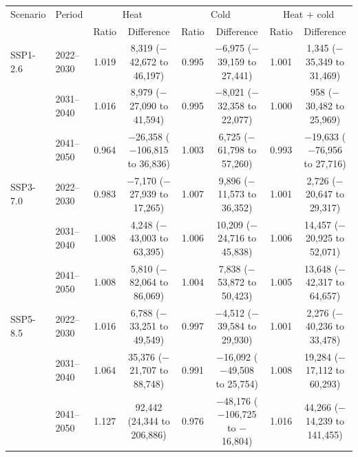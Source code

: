 \begin{tabular}{llcccccc}
\toprule
Scenario & Period & \multicolumn{2}{c}{Heat} & \multicolumn{2}{c}{Cold} & \multicolumn{2}{c}{Heat + cold} \\ & & Ratio & Difference & Ratio & Difference & Ratio & Difference \\
\midrule
SSP1-2.6 & 2022--2030 & 1.019 & 8,319 ($-$42,672 to 46,197) & 0.995 & $-$6,975 ($-$39,159 to 27,441) & 1.001 & 1,345 ($-$35,349 to 31,469) \\
 & 2031--2040 & 1.016 & 8,979 ($-$27,090 to 41,594) & 0.995 & $-$8,021 ($-$32,358 to 22,077) & 1.000 & 958 ($-$30,482 to 25,969) \\
 & 2041--2050 & 0.964 & $-$26,358 ($-$106,815 to 36,836) & 1.003 & 6,725 ($-$61,798 to 57,260) & 0.993 & $-$19,633 ($-$76,956 to 27,716) \\
\addlinespace
SSP3-7.0 & 2022--2030 & 0.983 & $-$7,170 ($-$27,939 to 17,265) & 1.007 & 9,896 ($-$11,573 to 36,352) & 1.001 & 2,726 ($-$20,647 to 29,317) \\
 & 2031--2040 & 1.008 & 4,248 ($-$43,003 to 63,395) & 1.006 & 10,209 ($-$24,716 to 45,838) & 1.006 & 14,457 ($-$20,925 to 52,071) \\
 & 2041--2050 & 1.008 & 5,810 ($-$82,064 to 86,069) & 1.004 & 7,838 ($-$53,872 to 50,423) & 1.005 & 13,648 ($-$42,317 to 64,657) \\
\addlinespace
SSP5-8.5 & 2022--2030 & 1.016 & 6,788 ($-$33,251 to 49,549) & 0.997 & $-$4,512 ($-$39,584 to 29,930) & 1.001 & 2,276 ($-$40,236 to 33,478) \\
 & 2031--2040 & 1.064 & 35,376 ($-$21,707 to 88,748) & 0.991 & $-$16,092 ($-$49,508 to 25,754) & 1.008 & 19,284 ($-$17,112 to 60,293) \\
 & 2041--2050 & 1.127 & 92,442 (24,344 to 206,886) & 0.976 & $-$48,176 ($-$106,725 to $-$16,804) & 1.016 & 44,266 ($-$14,239 to 141,455) \\
\bottomrule
\end{tabular}
